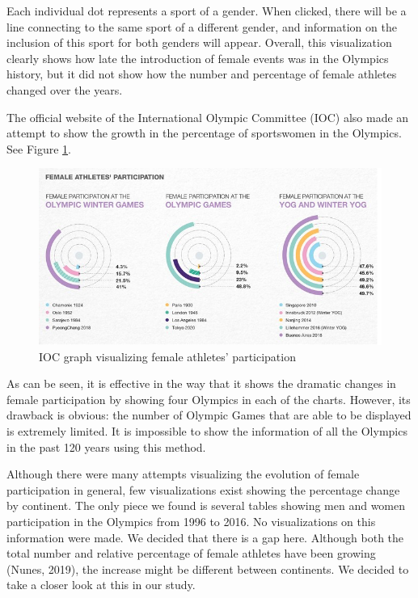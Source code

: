 \documentclass[
]{article}
\begin{document}
Each individual dot represents a sport of a gender. When clicked, there will be a line connecting to the same sport of a different gender, and information on the inclusion of this sport for both genders will appear. Overall, this visualization clearly shows how late the introduction of female events was in the Olympics history, but it did not show how the number and percentage of female athletes changed over the years.

The official website of the International Olympic Committee (IOC) also made an attempt to show the growth in the percentage of sportswomen in the Olympics. See Figure \ref{fig:figure03}.

\begin{figure}

{\centering \includegraphics[width=0.95\linewidth]{static/pics/1-5} 

}

\caption{IOC graph visualizing female athletes' participation}\label{fig:figure03}
\end{figure}

As can be seen, it is effective in the way that it shows the dramatic changes in female participation by showing four Olympics in each of the charts. However, its drawback is obvious: the number of Olympic Games that are able to be displayed is extremely limited. It is impossible to show the information of all the Olympics in the past 120 years using this method.

Although there were many attempts visualizing the evolution of female participation in general, few visualizations exist showing the percentage change by continent. The only piece we found is several tables showing men and women participation in the Olympics from 1996 to 2016. No visualizations on this information were made. We decided that there is a gap here. Although both the total number and relative percentage of female athletes have been growing (Nunes, 2019), the increase might be different between continents. We decided to take a closer look at this in our study.
\end{document}
